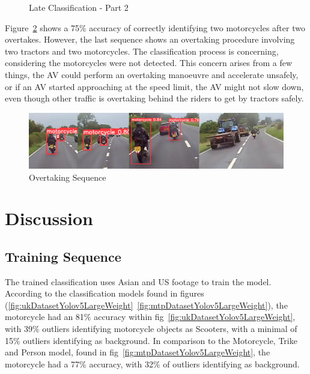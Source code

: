 \documentclass[conference]{IEEEtran}
\begin{document}
\begin{figure}[h]
\begin{minipage}{0.15\textwidth}
			\caption{Late Classification - Part 2}
			\label{fig:lateClassificationP2}
		\end{minipage}
	\end{figure}	

	Figure~\ref{fig:overtakingSequence} shows a 75\% accuracy of correctly identifying two motorcycles after two overtakes. However, the last sequence shows an overtaking procedure involving two tractors and two motorcycles. The classification process is concerning, considering the motorcycles were not detected. This concern arises from a few things, the AV could perform an overtaking manoeuvre and accelerate unsafely, or if an AV started approaching at the speed limit, the AV might not slow down, even though other traffic is overtaking behind the riders to get by tractors safely.
	\begin{figure}[h]
		\centering
		\includegraphics[width=\columnwidth]{Figures/motorcycle_overtaking_sequence.png}
		\caption{Overtaking Sequence}
		\label{fig:overtakingSequence}
	\end{figure}
	
\section{Discussion}
	\subsection{Training Sequence}
	The trained classification uses Asian and US footage to train the model. According to the classification models found in figures (\ref{fig:ukDatasetYolov5LargeWeight}~\ref{fig:mtpDatasetYolov5LargeWeight}), the motorcycle had an 81\% accuracy within fig~\ref{fig:ukDatasetYolov5LargeWeight}, with 39\% outliers identifying motorcycle objects as Scooters, with a minimal of 15\% outliers identifying as background. In comparison to the Motorcycle, Trike and Person model, found in fig~\ref{fig:mtpDatasetYolov5LargeWeight}, the motorcycle had a 77\% accuracy, with 32\% of outliers identifying as background.
\end{document}
